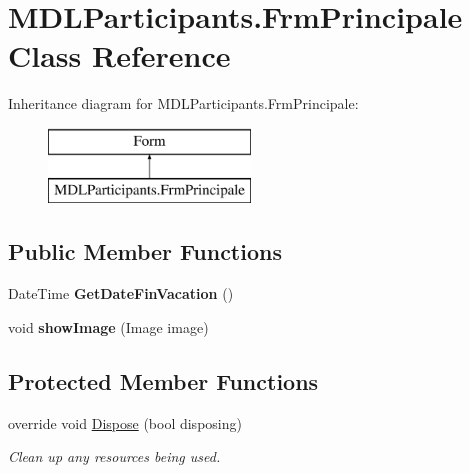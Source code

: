 \hypertarget{class_m_d_l_participants_1_1_frm_principale}{}\section{M\+D\+L\+Participants.\+Frm\+Principale Class Reference}
\label{class_m_d_l_participants_1_1_frm_principale}
Inheritance diagram for M\+D\+L\+Participants.\+Frm\+Principale\+:\begin{figure}[H]
\begin{center}
\leavevmode
\includegraphics[height=2.000000cm]{class_m_d_l_participants_1_1_frm_principale}
\end{center}
\end{figure}
\subsection*{Public Member Functions}
\begin{DoxyCompactItemize}
\item 
\hypertarget{class_m_d_l_participants_1_1_frm_principale_a7437d2d5b3d27175d25d6a1025b5faf4}{}Date\+Time {\bfseries Get\+Date\+Fin\+Vacation} ()\label{class_m_d_l_participants_1_1_frm_principale_a7437d2d5b3d27175d25d6a1025b5faf4}

\item 
\hypertarget{class_m_d_l_participants_1_1_frm_principale_a76a5ff04d2e198edd649a23311b7db96}{}void {\bfseries show\+Image} (Image image)\label{class_m_d_l_participants_1_1_frm_principale_a76a5ff04d2e198edd649a23311b7db96}

\end{DoxyCompactItemize}
\subsection*{Protected Member Functions}
\begin{DoxyCompactItemize}
\item 
override void \hyperlink{class_m_d_l_participants_1_1_frm_principale_a755d6a66f41b95207a389f3991cfd6ad}{Dispose} (bool disposing)
\begin{DoxyCompactList}\small\item\em Clean up any resources being used. \end{DoxyCompactList}\end{DoxyCompactItemize}


